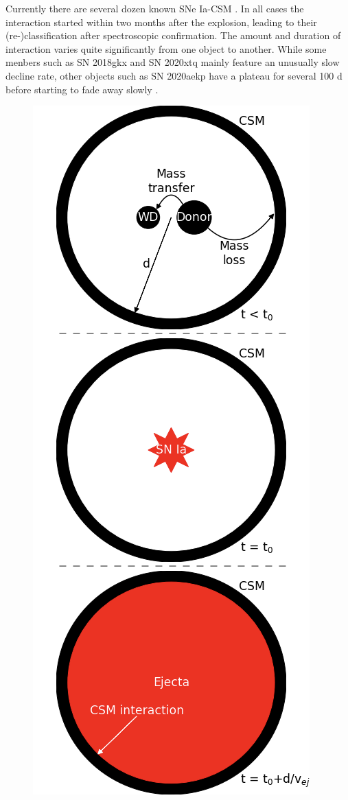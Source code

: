 \documentclass[a4paper,oneside,12pt, class=Latex/Classes/PhDthesisPSnPDF, crop=false]{standalone}
\begin{document}
Currently there are several dozen known SNe Ia-CSM \citep{2005gj, Ia-CSM_Silverman, Ia-CSM_BTS}. In all cases the interaction started within two months after the explosion, leading to their (re-)classification after spectroscopic confirmation. The amount and duration of interaction varies quite significantly from one object to another. While some menbers such as SN 2018gkx and SN 2020xtq mainly feature an unusually slow decline rate, other objects such as SN 2020aekp have a plateau for several 100 d before starting to fade away slowly \citep{Ia-CSM_BTS}.

\begin{figure}
    \centering
    \includegraphics[height=0.847\textheight]{../Images/chapter_1/CSM_sketch_vert.png}

\end{figure}
\end{document}
